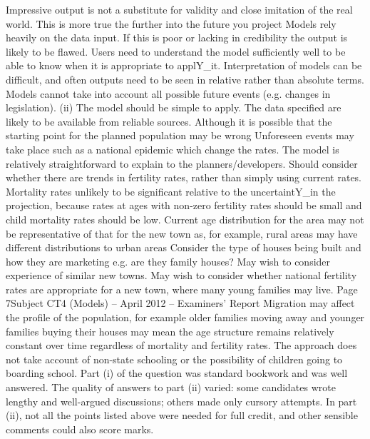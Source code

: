 Impressive output is not a substitute for validity and close imitation of the real world.
This is more true the further into the future you project
Models rely heavily on the data input. If this is poor or lacking in credibility the
output is likely to be flawed.
Users need to understand the model sufficiently well to be able to know when it is
appropriate to applY_it.
Interpretation of models can be difficult, and often outputs need to be seen in relative
rather than absolute terms.
Models cannot take into account all possible future events (e.g. changes in
legislation).
(ii)
The model should be simple to apply.
The data specified are likely to be available from reliable sources.
Although it is possible that the starting point for the planned population may
be wrong
Unforeseen events may take place such as a national epidemic which change
the rates.
The model is relatively straightforward to explain to the planners/developers.
Should consider whether there are trends in fertility rates, rather than simply using
current rates.
Mortality rates unlikely to be significant relative to the uncertaintY_in the projection,
because rates at ages with non-zero fertility rates should be small and child mortality
rates should be low.
Current age distribution for the area may not be representative of that for the new
town as, for example, rural areas may have different distributions to urban areas
Consider the type of houses being built and how they are marketing e.g. are they
family houses?
May wish to consider experience of similar new towns.
May wish to consider whether national fertility rates are appropriate for a new town,
where many young families may live.
Page 7Subject CT4 (Models) – April 2012 – Examiners’ Report
Migration may affect the profile of the population, for example older families moving
away and younger families buying their houses may mean the age structure remains
relatively constant over time regardless of mortality and fertility rates.
The approach does not take account of non-state schooling or the possibility of
children going to boarding school.
Part (i) of the question was standard bookwork and was well answered. The quality of
answers to part (ii) varied: some candidates wrote lengthy and well-argued discussions;
others made only cursory attempts. In part (ii), not all the points listed above were needed
for full credit, and other sensible comments could also score marks.

